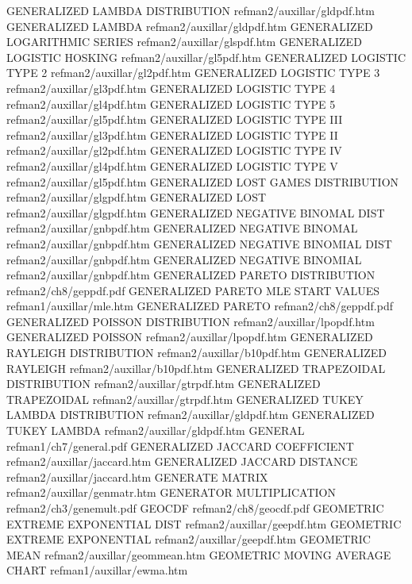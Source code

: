 GENERALIZED LAMBDA DISTRIBUTION         refman2/auxillar/gldpdf.htm
GENERALIZED LAMBDA                      refman2/auxillar/gldpdf.htm
GENERALIZED LOGARITHMIC SERIES          refman2/auxillar/glspdf.htm
GENERALIZED LOGISTIC HOSKING            refman2/auxillar/gl5pdf.htm
GENERALIZED LOGISTIC TYPE 2             refman2/auxillar/gl2pdf.htm
GENERALIZED LOGISTIC TYPE 3             refman2/auxillar/gl3pdf.htm
GENERALIZED LOGISTIC TYPE 4             refman2/auxillar/gl4pdf.htm
GENERALIZED LOGISTIC TYPE 5             refman2/auxillar/gl5pdf.htm
GENERALIZED LOGISTIC TYPE III           refman2/auxillar/gl3pdf.htm
GENERALIZED LOGISTIC TYPE II            refman2/auxillar/gl2pdf.htm
GENERALIZED LOGISTIC TYPE IV            refman2/auxillar/gl4pdf.htm
GENERALIZED LOGISTIC TYPE V             refman2/auxillar/gl5pdf.htm
GENERALIZED LOST GAMES DISTRIBUTION     refman2/auxillar/glgpdf.htm
GENERALIZED LOST                        refman2/auxillar/glgpdf.htm
GENERALIZED NEGATIVE BINOMAL DIST       refman2/auxillar/gnbpdf.htm
GENERALIZED NEGATIVE BINOMAL            refman2/auxillar/gnbpdf.htm
GENERALIZED NEGATIVE BINOMIAL DIST      refman2/auxillar/gnbpdf.htm
GENERALIZED NEGATIVE BINOMIAL           refman2/auxillar/gnbpdf.htm
GENERALIZED PARETO DISTRIBUTION         refman2/ch8/geppdf.pdf
GENERALIZED PARETO MLE START VALUES     refman1/auxillar/mle.htm
GENERALIZED PARETO                      refman2/ch8/geppdf.pdf
GENERALIZED POISSON DISTRIBUTION        refman2/auxillar/lpopdf.htm
GENERALIZED POISSON                     refman2/auxillar/lpopdf.htm
GENERALIZED RAYLEIGH DISTRIBUTION       refman2/auxillar/b10pdf.htm
GENERALIZED RAYLEIGH                    refman2/auxillar/b10pdf.htm
GENERALIZED TRAPEZOIDAL DISTRIBUTION    refman2/auxillar/gtrpdf.htm
GENERALIZED TRAPEZOIDAL                 refman2/auxillar/gtrpdf.htm
GENERALIZED TUKEY LAMBDA DISTRIBUTION   refman2/auxillar/gldpdf.htm
GENERALIZED TUKEY LAMBDA                refman2/auxillar/gldpdf.htm
GENERAL                                 refman1/ch7/general.pdf
GENERALIZED JACCARD COEFFICIENT         refman2/auxillar/jaccard.htm
GENERALIZED JACCARD DISTANCE            refman2/auxillar/jaccard.htm
GENERATE MATRIX                         refman2/auxillar/genmatr.htm
GENERATOR MULTIPLICATION                refman2/ch3/genemult.pdf
GEOCDF                                  refman2/ch8/geocdf.pdf
GEOMETRIC EXTREME EXPONENTIAL DIST      refman2/auxillar/geepdf.htm
GEOMETRIC EXTREME EXPONENTIAL           refman2/auxillar/geepdf.htm
GEOMETRIC MEAN                          refman2/auxillar/geommean.htm
GEOMETRIC MOVING AVERAGE CHART          refman1/auxillar/ewma.htm
